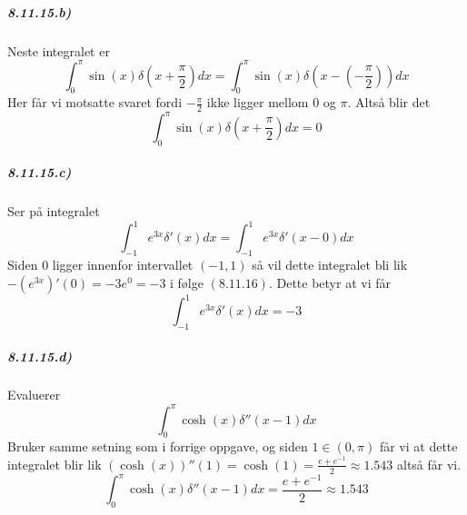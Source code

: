 \documentclass[11pt, A4paper,norsk]{article}
\begin{document}
\clearpage







			\subparagraph{8.11.15.b)}
				\begin{flushleft}
Neste integralet er
$$\int_{0}^{\pi} \sin(x) \delta\left( x + \frac{\pi}{2} \right) dx = \int_{0}^{\pi} \sin(x) \delta\left( x - \left( - \frac{\pi}{2} \right) \right) dx$$
Her får vi motsatte svaret fordi $- \frac{\pi}{2}$ ikke ligger mellom $0$ og $\pi$. Altså blir det
$$\int_{0}^{\pi} \sin(x) \delta\left( x + \frac{\pi}{2} \right) dx = 0$$
				\end{flushleft}












			\subparagraph{8.11.15.c)}
				\begin{flushleft}
Ser på integralet
$$\int_{-1}^{1} e^{3x} \delta'(x) dx = \int_{-1}^{1} e^{3x} \delta'(x - 0) dx$$
Siden $0$ ligger innenfor intervallet $(-1, 1)$ så vil dette integralet bli lik $- \left( e^{3x} \right)'(0) = - 3e^{0} = - 3$ i følge $(8.11.16)$. Dette betyr at vi får
$$\int_{-1}^{1} e^{3x} \delta'(x) dx = - 3$$
				\end{flushleft}












			\subparagraph{8.11.15.d)}
				\begin{flushleft}
Evaluerer
$$\int_{0}^{\pi} \cosh(x) \delta''(x - 1) dx$$
Bruker samme setning som i forrige oppgave, og siden $1 \in (0, \pi)$ får vi at dette integralet blir lik $\left( \cosh(x) \right)''(1) = \cosh(1) = \frac{e + e^{-1}}{2} \approx 1.543$ altså får vi.
$$\int_{0}^{\pi} \cosh(x) \delta''(x - 1) dx = \frac{e + e^{-1}}{2} \approx 1.543$$
				\end{flushleft}
\end{document}

